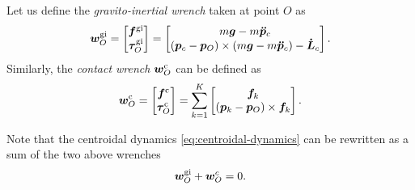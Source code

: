 Let us define the \textit{gravito-inertial wrench} taken at point $O$ as
\begin{equation}
    \label{eq:gravito-intertial-wrench}
    \bm{w}_O^{\rm gi}
    =
    \begin{bmatrix}
        \bm{f}^{\rm gi}\\
        \bm{\tau}_O^{\rm gi}
    \end{bmatrix}
    =
    \begin{bmatrix}
        m \bm{g} - m \bm{\ddot{p}}_c \\
        (\bm{p}_c - \bm{p}_O) \times (m \bm{g} - m \bm{\ddot{p}}_c) - \bm{\dot{L}}_c
    \end{bmatrix}.
\end{equation}
Similarly, the \textit{contact wrench} $\bm{w}_O^{\rm c}$ can be defined as
\begin{equation}
    \label{eq:contact-wrench}
    \bm{w}_O^{\rm c}
    =
    \begin{bmatrix}
        \bm{f}^{\rm c} \\
        \bm{\tau}_O^{\rm c}
    \end{bmatrix}
    =
    \sum_{k=1}^K
    \begin{bmatrix}
        \bm{f}_k\\
        (\bm{p}_k - \bm{p}_O) \times \bm{f}_k
    \end{bmatrix}.
\end{equation}

Note that the centroidal dynamics \eqref{eq:centroidal-dynamics} can be
rewritten as a sum of the two above wrenches
\begin{equation}
    \bm{w}_O^{\rm gi} + \bm{w}_O^c = 0.
\end{equation}

